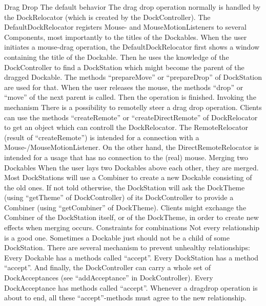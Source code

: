 \documentclass[a4paper,10pt]{article}
\begin{document}
Drag  Drop
The default behavior
The drag  drop operation normally is handled by the DockRelocator (which is created by the DockController).
The DefaultDockRelocator registers Mouse- and MouseMotionListeners to several Components, most importantly to the titles of the Dockables.
When the user initiates a mouse-drag operation, the DefaultDockRelocator first shows a window containing the title of the Dockable. Then he uses the knowledge of the DockController to find a DockStation which might become the parent of the dragged Dockable. The methods “prepareMove” or “prepareDrop” of DockStation are used for that.
When the user releases the mouse, the methods “drop” or “move” of the next parent is called. Then the operation is finished.
Invoking the mechanism
There is a possibility to remotelly steer a drag  drop operation. Clients can use the methods “createRemote” or “createDirectRemote” of DockRelocator to get an object which can controll the DockRelocator.
The RemoteRelocator (result of “createRemote”) is intended for a connection with a Mouse-/MouseMotionListener.
On the other hand, the DirectRemoteRelocator is intended for a usage that has no connection to the (real) mouse.
Merging two Dockables
When the user lays two Dockables above each other, they are merged. Most DockStations will use a Combiner to create a new Dockable consisting of the old ones. If not told otherwise, the DockStation will ask the DockTheme (using “getTheme” of DockController) of its DockController to provide a Combiner (using “getCombiner” of DockTheme).
Clients might exchange the Combiner of the DockStation itself, or of the DockTheme, in order to create new effects when merging occurs.
Constraints for combinations
Not every relationship is a good one. Sometimes a Dockable just should not be a child of some DockStation.
There are several mechanism to prevent unhealthy relationships:
Every Dockable has a methods called “accept”.
Every DockStation has a method “accept”.
And finally, the DockController can carry a whole set of DockAcceptances (see “addAcceptance” in DockController). Every DockAcceptance has methods called “accept”.
Whenever a dragdrop operation is about to end, all these “accept”-methods must agree to the new relationship.
\end{document}

